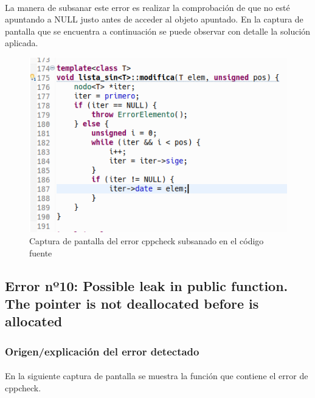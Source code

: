 			\paragraph{}La manera de subsanar este error es realizar la comprobación de que no esté apuntando a NULL justo antes de acceder al objeto apuntado. En la captura de pantalla que se encuentra a continuación se puede observar con detalle la solución aplicada.
			
			\begin{figure}[H]
				\centering
				\includegraphics[scale=0.55]{img/captura90.png}
				\caption{Captura de pantalla del error cppcheck subsanado en el código fuente}
				\label{captura90}
			\end{figure}
		
	\subsection{Error nº10: Possible leak in public function. The pointer is not deallocated before is allocated}
	
		\subsubsection{Origen/explicación del error detectado}
		
			\paragraph{}En la siguiente captura de pantalla se muestra la función que contiene el error de cppcheck.
		
